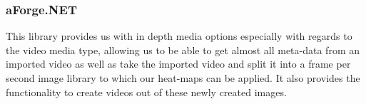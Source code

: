 \subsubsection{aForge.NET}
\begin{flushleft}
This library provides us with in depth media options especially with regards to the video media type, allowing us to be able to get almost all meta-data from an imported video as well as take the imported video and split it into a frame per second image library to which our heat-maps can be applied. It also provides the functionality to create videos out of these newly created images.
\end{flushleft}